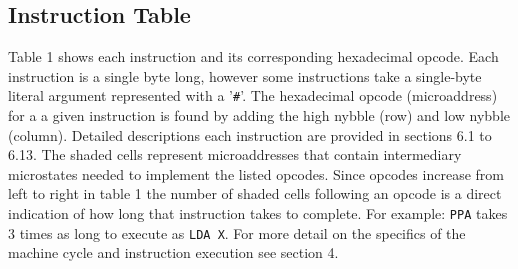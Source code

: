 \documentclass[a4paper,12pt]{article}
\begin{document}
\subsection{Instruction Table}
Table 1 shows each instruction and its corresponding hexadecimal opcode. Each
instruction is a single byte long, however some instructions take a single-byte
literal argument represented with a '\texttt{\#}'. The hexadecimal opcode
(microaddress) for a a given instruction is found by adding the high nybble
(row) and low nybble (column). Detailed descriptions each instruction are
provided in sections 6.1 to 6.13. The shaded cells represent microaddresses
that contain intermediary microstates needed to implement the listed opcodes.
Since opcodes increase from left to right in table 1 the number of shaded cells
following an opcode is a direct indication of how long that instruction takes
to complete. For example: \texttt{PPA} takes 3 times as long to execute as
\texttt{LDA X}. For more detail on the specifics of the machine cycle and
instruction execution see section 4.
\par

\newpage

\newcommand{\fc}{\cellcolor{ucode-grey}}
\end{document}
